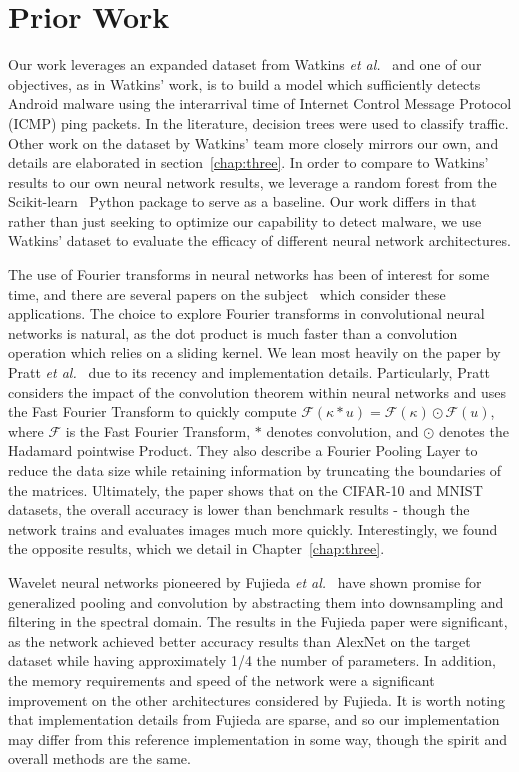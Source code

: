 \section{Prior Work}
Our work leverages an expanded dataset from Watkins \textit{et al.}~\cite{watkins2013using} and one of our objectives, as in Watkins' work, is to build a model which sufficiently detects Android malware using the interarrival time of Internet Control Message Protocol (ICMP) ping packets.
In the literature, decision trees were used to classify traffic.
Other work on the dataset by Watkins' team more closely mirrors our own, and details are elaborated in section~\ref{chap:three}.
In order to compare to Watkins' results to our own neural network results, we leverage a random forest from the Scikit-learn~\cite{scikit-learn} Python package to serve as a baseline.
Our work differs in that rather than just seeking to optimize our capability to detect malware, we use Watkins' dataset to evaluate the efficacy of different neural network architectures.

The use of Fourier transforms in neural networks has been of interest for some time, and there are several papers on the subject~\cite{osowski2002fourier, pratt2017fcnn, highlander2016very} which consider these applications.
The choice to explore Fourier transforms in convolutional neural networks is natural, as the dot product is much faster than a convolution operation which relies on a sliding kernel. 
We lean most heavily on the paper by Pratt \textit{et al.}~\cite{pratt2017fcnn} due to its recency and implementation details. 
Particularly, Pratt considers the impact of the convolution theorem within neural networks and uses the Fast Fourier Transform to quickly compute $\mathcal{F}(\kappa * u) = \mathcal{F}(\kappa) \odot \mathcal{F}(u)$, where $\mathcal{F}$ is the Fast Fourier Transform, $*$ denotes convolution, and $\odot$ denotes the Hadamard pointwise Product.
They also describe a Fourier Pooling Layer to reduce the data size while retaining information by truncating the boundaries of the matrices.
Ultimately, the paper shows that on the CIFAR-10 and MNIST datasets, the overall accuracy is lower than benchmark results - though the network trains and evaluates images much more quickly.
Interestingly, we found the opposite results, which we detail in Chapter~\ref{chap:three}.

Wavelet neural networks pioneered by Fujieda \textit{et al.}~\cite{fujieda2017wavelet} have shown promise for generalized pooling and convolution by abstracting them into downsampling and filtering in the spectral domain.
The results in the Fujieda paper were significant, as the network achieved better accuracy results than AlexNet on the target dataset while having approximately 1/4 the number of parameters.
In addition, the memory requirements and speed of the network were a significant improvement on the other architectures considered by Fujieda.
It is worth noting that implementation details from Fujieda are sparse, and so our implementation may differ from this reference implementation in some way, though the spirit and overall methods are the same.

